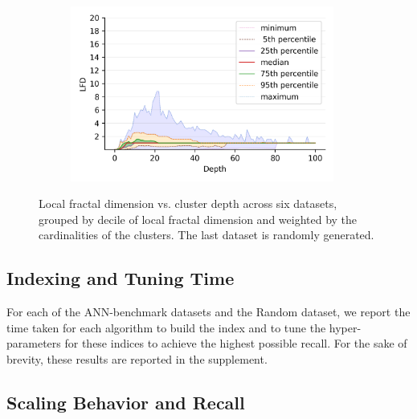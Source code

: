 \begin{figure}
\begin{subfigure}[b]{0.47\textwidth}
        \label{fig:results:silva-lfd}
    \end{subfigure}%
    \begin{subfigure}[b]{0.47\textwidth}
        \includegraphics[width=0.95\textwidth]{images/lfd/silva-SSU-Ref.png}\\
        \label{fig:results:radioml-lfd}
    \end{subfigure}%
    \caption{Local fractal dimension vs. cluster depth across six datasets, grouped by decile of local fractal dimension and weighted by the cardinalities of the clusters.
    The last dataset is randomly generated.}
    \label{fig:results:lfd-plots}
\end{figure}


\subsection{Indexing and Tuning Time}
\label{sec:results:indexing-and-tuning-time}

For each of the ANN-benchmark datasets and the Random dataset, we report the time taken for each algorithm to build the index and to tune the hyper-parameters for these indices to achieve the highest possible recall. For the sake of brevity, these results are reported in the supplement.


\subsection{Scaling Behavior and Recall}
\label{sec:results:scaling-behavior-and-recall}

